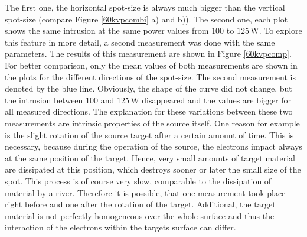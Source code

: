 The first one, the horizontal spot-size is always much bigger than the vertical spot-size (compare Figure \ref{60kvpcombi} a) and b)). The second one, each plot shows the same  intrusion at the same power values from $100$ to $125\,$W. To explore this feature in more detail, a second measurement was done with the same parameters. The results of this measurement are shown in Figure \ref{60kvpcomp}. For better comparison, only the mean values of both measurements are shown in the plots for the different directions of the spot-size. The second measurement is denoted by the blue line. Obviously, the shape of the curve did not change, but the intrusion between $100$ and $125\,$W disappeared and the values are bigger for all measured directions. The explanation for these variations between these two measurements are intrinsic properties of the source itself. One reason for example is the slight rotation of the source target after a certain amount of time. This is necessary, because during the operation of the source, the electrons impact always at the same position of the target. Hence, very small amounts of target material are dissipated at this position, which destroys sooner or later the small size of the spot. This process is of course very slow, comparable to the dissipation of material by a river.
\clearpage
Therefore it is possible, that one measurement took place right before and one after the rotation of the target. Additional, the target material is not perfectly homogeneous over the whole surface and thus the interaction of the electrons within the targets surface can differ.\\


